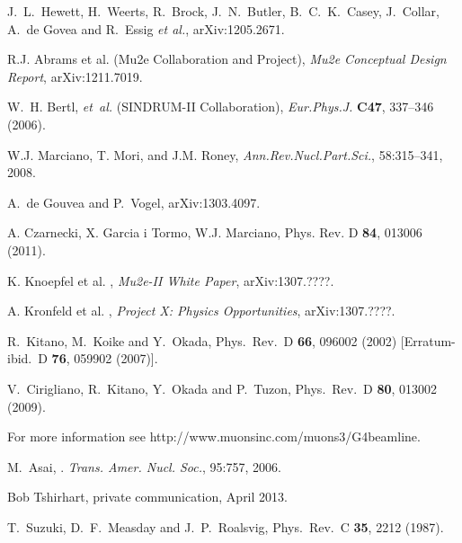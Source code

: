 \begin{thebibliography}{99}

% 
% 
  J.~L.~Hewett, H.~Weerts, R.~Brock, J.~N.~Butler, B.~C.~K.~Casey, J.~Collar, A.~de Govea and R.~Essig {\it et al.},
  arXiv:1205.2671.

 R.J. Abrams et al. (Mu2e Collaboration and Project), 
  {\it{Mu2e Conceptual Design Report}}, arXiv:1211.7019.

W.~H. Bertl, {\it et~al.} (SINDRUM-II Collaboration), \emph{Eur.Phys.J.} \textbf{C47}, 337--346 (2006).

W.J. Marciano, T. Mori, and J.M. Roney,
\emph{Ann.Rev.Nucl.Part.Sci.}, 58:315--341, 2008.

  A.~de Gouvea and P.~Vogel,
  arXiv:1303.4097.

 A. Czarnecki, X. Garcia i Tormo, W.J. Marciano, 
  Phys. Rev. D {\bf 84}, 013006 (2011).


 K. Knoepfel et al. , 
  {\it{Mu2e-II White Paper}}, arXiv:1307.????.

 A. Kronfeld et al. , 
  {\it{Project X: Physics Opportunities}}, arXiv:1307.????.

  R.~Kitano, M.~Koike and Y.~Okada,
  Phys.\ Rev.\ D {\bf 66}, 096002 (2002)
  [Erratum-ibid.\ D {\bf 76}, 059902 (2007)].

  V.~Cirigliano, R.~Kitano, Y.~Okada and P.~Tuzon,
  Phys.\ Rev.\ D {\bf 80}, 013002 (2009).

 For more information see http://www.muonsinc.com/muons3/G4beamline.

M.~Asai,
.
\emph{Trans. Amer. Nucl. Soc.}, 95:757, 2006.

 Bob Tshirhart, private communication, April 2013.

  T.~Suzuki, D.~F.~Measday and J.~P.~Roalsvig,
  Phys.\ Rev.\ C {\bf 35}, 2212 (1987).


\end{thebibliography}
